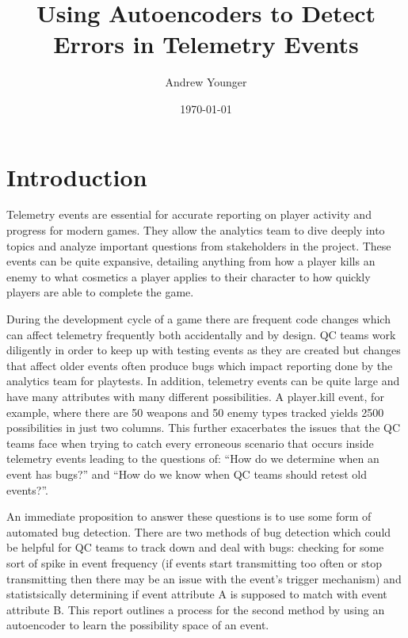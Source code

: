 \documentclass[a4paper,11pt]{article}
\title{Using Autoencoders to Detect Errors in Telemetry Events}
\author{Andrew Younger}
\date{\today}
\begin{document}
\begin{titlingpage}
 \maketitle
\end{titlingpage}
\newpage
{}
\section{Introduction}
Telemetry events are essential for accurate reporting on player activity and progress for modern games. They allow the analytics team to dive deeply into topics and analyze important questions from stakeholders in the project. These events can be quite expansive, detailing anything from how a player kills an enemy to what cosmetics a player applies to their character to how quickly players are able to complete the game.
\par
During the development cycle of a game there are frequent code changes which can affect telemetry frequently both accidentally and by design. QC teams work diligently in order to keep up with testing events as they are created but changes that affect older events often produce bugs which impact reporting done by the analytics team for playtests. In addition, telemetry events can be quite large and have many attributes with many different possibilities. A player.kill event, for example, where there are 50 weapons and 50 enemy types tracked yields 2500 possibilities in just two columns. This further exacerbates the issues that the QC teams face when trying to catch every erroneous scenario that occurs inside telemetry events leading to the questions of: ``How do we determine when an event has bugs?'' and ``How do we know when QC teams should retest old events?''.
\par
An immediate proposition to answer these questions is to use some form of automated bug detection. There are two methods of bug detection which could be helpful for QC teams to track down and deal with bugs: checking for some sort of spike in event frequency (if events start transmitting too often or stop transmitting then there may be an issue with the event's trigger mechanism) and statistsically determining if event attribute A is supposed to match with event attribute B. This report outlines a process for the second method by using an autoencoder to learn the possibility space of an event.
\end{document}
